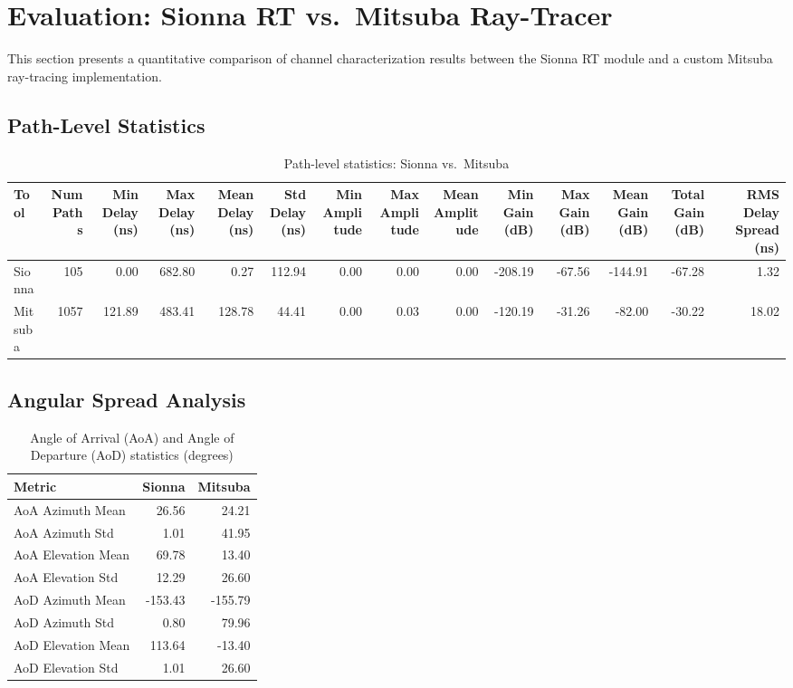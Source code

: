 
\section{Evaluation: Sionna RT vs.\ Mitsuba Ray-Tracer}
\label{sec:evaluation}

This section presents a quantitative comparison of channel characterization results between 
the Sionna RT module and a custom Mitsuba ray-tracing implementation.


\subsection{Path-Level Statistics}

\begin{table}
\caption{Path-level statistics: Sionna vs.\ Mitsuba}
\label{tab:path_stats}
\begin{tabular}{lrrrrrrrrrrrrr}
\toprule
Tool & Num Paths & Min Delay (ns) & Max Delay (ns) & Mean Delay (ns) & Std Delay (ns) & Min Amplitude & Max Amplitude & Mean Amplitude & Min Gain (dB) & Max Gain (dB) & Mean Gain (dB) & Total Gain (dB) & RMS Delay Spread (ns) \\
\midrule
Sionna & 105 & 0.00 & 682.80 & 0.27 & 112.94 & 0.00 & 0.00 & 0.00 & -208.19 & -67.56 & -144.91 & -67.28 & 1.32 \\
Mitsuba & 1057 & 121.89 & 483.41 & 128.78 & 44.41 & 0.00 & 0.03 & 0.00 & -120.19 & -31.26 & -82.00 & -30.22 & 18.02 \\
\bottomrule
\end{tabular}
\end{table}



\subsection{Angular Spread Analysis}

\begin{table}
\caption{Angle of Arrival (AoA) and Angle of Departure (AoD) statistics (degrees)}
\label{tab:angular_stats}
\begin{tabular}{lrr}
\toprule
Metric & Sionna & Mitsuba \\
\midrule
AoA Azimuth Mean & 26.56 & 24.21 \\
AoA Azimuth Std & 1.01 & 41.95 \\
AoA Elevation Mean & 69.78 & 13.40 \\
AoA Elevation Std & 12.29 & 26.60 \\
AoD Azimuth Mean & -153.43 & -155.79 \\
AoD Azimuth Std & 0.80 & 79.96 \\
AoD Elevation Mean & 113.64 & -13.40 \\
AoD Elevation Std & 1.01 & 26.60 \\
\bottomrule
\end{tabular}
\end{table}



